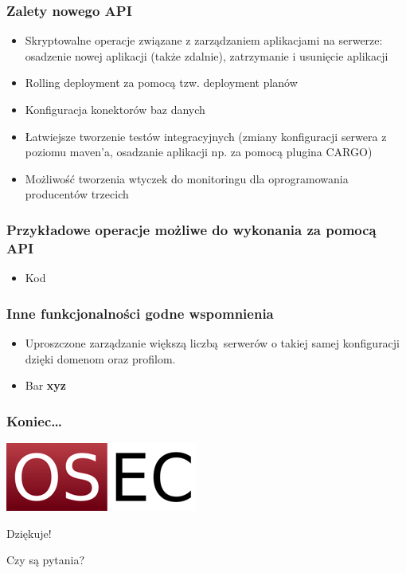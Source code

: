 \documentclass[dvipsnames,table]{beamer}
\begin{document}
\begin{frame}
\frametitle{Zalety nowego API}
\begin{itemize}
	\item Skryptowalne operacje związane z zarządzaniem aplikacjami na serwerze: osadzenie nowej aplikacji (także zdalnie), zatrzymanie i usunięcie aplikacji
	\item Rolling deployment za pomocą tzw. deployment planów
	\item Konfiguracja konektorów baz danych
	\item Łatwiejsze tworzenie testów integracyjnych (zmiany konfiguracji serwera z poziomu maven'a, osadzanie aplikacji np. za pomocą plugina CARGO)
	\item Możliwość tworzenia wtyczek do monitoringu dla oprogramowania producentów trzecich
\end{itemize}
\end{frame}

\begin{frame}
\frametitle{Przykładowe operacje możliwe do wykonania za pomocą API}
\begin{itemize}
	\item Kod
\end{itemize}
\end{frame}


\begin{frame}
\frametitle{Inne funkcjonalności godne wspomnienia}
\begin{itemize}
	\item Uproszczone zarządzanie większą liczbą serwerów o takiej samej konfiguracji dzięki domenom oraz profilom.
	\item Bar \textbf{xyz}
\end{itemize}
\end{frame}

\begin{frame}
\frametitle{Koniec\ldots}
\begin{center}
\includegraphics[scale=0.5]{img-oseclogo.png}

Dziękuje!

Czy są pytania?
\end{center}

\end{frame}

 
\end{document}
